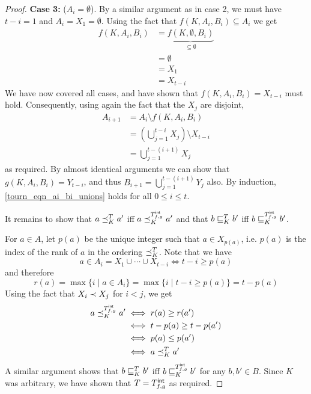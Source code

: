\begin{proof}
    \textbf{Case 3:} ($A_i = \emptyset$). By a similar argument as in case 2,
    we must have $t - i = 1$ and $A_i = X_1 = \emptyset$. Using the fact that
    $f(K, A_i, B_i) \subseteq A_i$ we get
    \begin{align*}
        f(K, A_i, B_i)
        &= \underbrace{f(K, \emptyset, B_i)}_{\subseteq \emptyset} \\
        &= \emptyset \\
        &= X_1 \\
        &= X_{t-i}
    \end{align*}
    We have now covered all cases, and have shown that $f(K, A_i, B_i) =
    X_{t-i}$ must hold. Consequently, using again the fact that the $X_j$ are
    disjoint,
    \begin{align*}
        A_{i+1}
        &= A_i \setminus f(K, A_i, B_i) \\
        &= \left(\bigcup_{j=1}^{t-i}{X_j}\right) \setminus X_{t-i} \\
        &= \bigcup_{j=1}^{t-(i+1)}{X_j}
    \end{align*}
    as required. By almost identical arguments we can show that $g(K, A_i, B_i)
    = Y_{t-i}$, and thus $B_{i+1} = \bigcup_{j=1}^{t-(i+1)}{Y_j}$ also. By
    induction, \cref{tourn_eqn_ai_bi_unions} holds for all $0 \le i \le t$.

    It remains to show that $a \preceq_K^T a'$ iff $a \preceq_K^{{T_{f,g}^\mathsf{int}}} a'$
    and that $b \sqsubseteq_K^T b'$ iff $b \sqsubseteq_K^{{T_{f,g}^\mathsf{int}}} b'$.

    For $a \in A$, let $p(a)$ be the unique integer such that $a \in X_{p(a)}$,
    i.e. $p(a)$ is the index of the rank of $a$ in the ordering
    ${\preceq_K^T}$. Note that we have
    \[
        a \in A_i = X_1 \cup \cdots \cup X_{t-i}
        \iff
        t - i \ge p(a)
    \]
    and therefore
    \[
        r(a)
        = \max\{i \mid a \in A_i\}
        = \max\{i \mid t - i \ge p(a)\}
        = t - p(a)
    \]
    Using the fact that $X_i \prec X_j$ for $i < j$, we get
    \begin{align*}
        a \preceq_K^{{T_{f,g}^\mathsf{int}}} a'
        &\iff r(a) \ge r(a') \\
        &\iff t - p(a) \ge t - p(a') \\
        &\iff p(a) \le p(a') \\
        &\iff a \preceq_K^T a'
    \end{align*}
    A similar argument shows that $b \sqsubseteq_K^T b'$ iff $b
    \sqsubseteq_K^{{T_{f,g}^\mathsf{int}}} b'$ for any $b, b' \in B$. Since $K$ was arbitrary, we
    have shown that $T = {T_{f,g}^\mathsf{int}}$ as required.
\end{proof}

